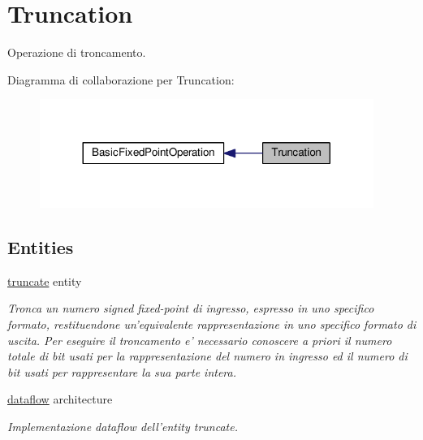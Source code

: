 \hypertarget{group___truncation}{\section{Truncation}
\label{group___truncation}
}


Operazione di troncamento.  


Diagramma di collaborazione per Truncation\+:\nopagebreak
\begin{figure}[H]
\begin{center}
\leavevmode
\includegraphics[width=308pt]{group___truncation}
\end{center}
\end{figure}
\subsection*{Entities}
\begin{DoxyCompactItemize}
\item 
\hyperlink{classtruncate}{truncate} entity
\begin{DoxyCompactList}\small\item\em Tronca un numero signed fixed-\/point di ingresso, espresso in uno specifico formato, restituendone un'equivalente rappresentazione in uno specifico formato di uscita. Per eseguire il troncamento e' necessario conoscere a priori il numero totale di bit usati per la rappresentazione del numero in ingresso ed il numero di bit usati per rappresentare la sua parte intera. \end{DoxyCompactList}\item 
\hyperlink{classtruncate_1_1dataflow}{dataflow} architecture
\begin{DoxyCompactList}\small\item\em Implementazione dataflow dell'entity truncate. \end{DoxyCompactList}\end{DoxyCompactItemize}
